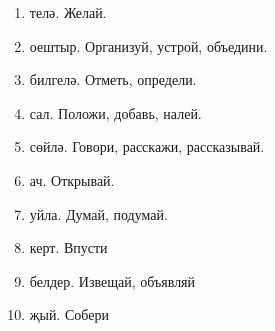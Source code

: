 \begin{multicols}{4}
\begin{enumerate}
    \item телә. Желай.
    \item оештыр. Организуй, устрой, объедини.
    \item билгелә. Отметь, определи.
    \item сал. Положи, добавь, налей.
    \item сөйлә. Говори, расскажи, рассказывай.
    \item ач. Открывай.
    \item уйла. Думай, подумай.
    \item керт. Впусти
    \item белдер. Извещай, объявляй
    \item җый. Собери

\end{enumerate}
\end{multicols}